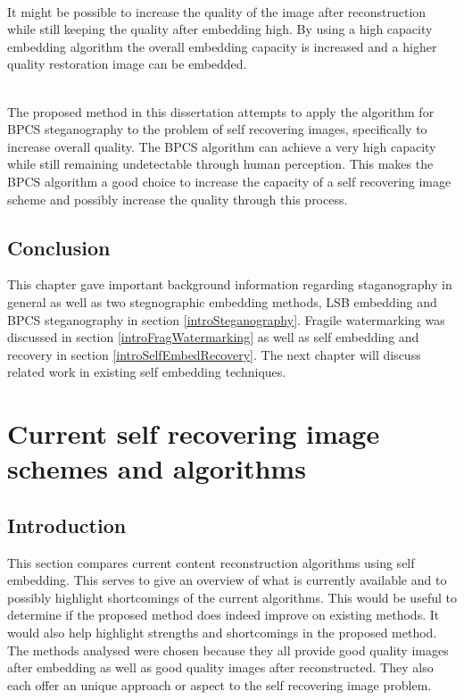 \documentclass[12pt]{article}
\begin{document}
\hspace{0pt} \\
It might be possible to increase the quality of the image after reconstruction while still keeping the quality after embedding high.
By using a high capacity embedding algorithm the overall embedding capacity is increased and a higher quality restoration image can be embedded. 

\hspace{0pt} \\
The proposed method in this dissertation attempts to apply the algorithm for BPCS steganography
to the problem of self recovering images, specifically to increase overall quality.
The BPCS algorithm can achieve a very high capacity while still remaining undetectable through human perception.
This makes the BPCS algorithm a good choice to increase the capacity of a self recovering image scheme and possibly increase the quality through this process.

\subsection{Conclusion}
\label{introConclusion}
This chapter gave important background information regarding staganography in general as well as two stegnographic embedding methods, LSB embedding and BPCS steganography in section \ref{introSteganography}.
Fragile watermarking was discussed in section \ref{introFragWatermarking} as well as self embedding and recovery in section \ref{introSelfEmbedRecovery}.
The next chapter will discuss related work in existing self embedding techniques.

\section{Current self recovering image schemes and algorithms}
\label{currentSelfRecoveringSchemes}
\subsection{Introduction}
This section compares current content reconstruction algorithms using self embedding.
This serves to give an overview of what is currently available and to possibly highlight shortcomings of the current algorithms.
This would be useful to determine if the proposed method does indeed improve on existing methods. 
It would also help highlight strengths and shortcomings in the proposed method.
The methods analysed were chosen because they all provide good quality images after embedding as well as good quality images after reconstructed.
They also each offer an unique approach or aspect to the self recovering image problem.
\end{document}
